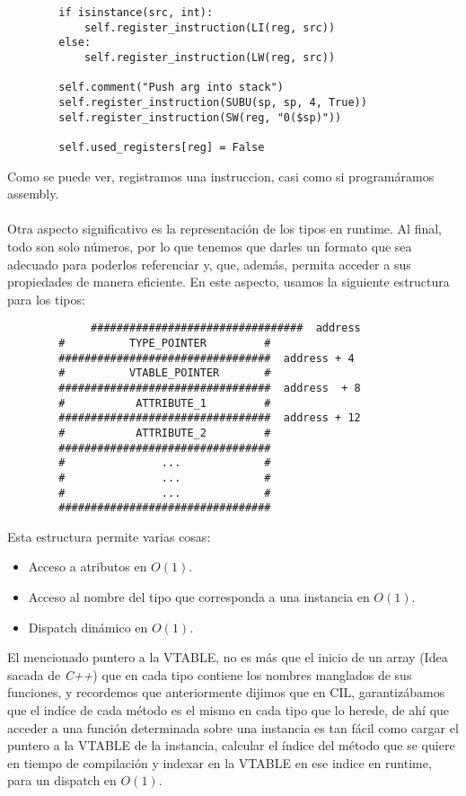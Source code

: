 \documentclass[a4paper, 12pt]{article}
\begin{document}
\begin{itemize}
\begin{verbatim}
        if isinstance(src, int):
            self.register_instruction(LI(reg, src))
        else:
            self.register_instruction(LW(reg, src))

        self.comment("Push arg into stack")
        self.register_instruction(SUBU(sp, sp, 4, True))
        self.register_instruction(SW(reg, "0($sp)"))

        self.used_registers[reg] = False
\end{verbatim}

Como se puede ver, registramos una instruccion, casi como si program\'aramos assembly.

\paragraph{}
Otra aspecto significativo es la representaci\'on de los tipos en runtime. Al final, todo son solo n\'umeros,
por lo que tenemos que darles un formato que sea adecuado para poderlos referenciar y, que, adem\'as, permita
acceder a sus propiedades de manera eficiente. En este aspecto, usamos la siguiente estructura para los tipos:

\begin{verbatim}
		     #################################  address
    	#          TYPE_POINTER         #
    	#################################  address + 4
    	#          VTABLE_POINTER       #
    	#################################  address  + 8
    	#           ATTRIBUTE_1         #
    	#################################  address + 12
    	#           ATTRIBUTE_2         #
    	#################################
    	#               ...             #
    	#               ...             #
    	#               ...             #
    	#################################
\end{verbatim}

Esta estructura permite varias cosas:
\begin{itemize}
	\item Acceso a atributos en $O(1)$.
	\item Acceso al nombre del tipo que corresponda a una instancia en $O(1)$.
	\item Dispatch din\'amico en $O(1)$.
\end{itemize}

El mencionado puntero a la VTABLE, no es m\'as que el inicio de un array (Idea sacada de \textit{C++}) que en cada
tipo contiene los nombres manglados de sus funciones, y recordemos que anteriormente dijimos que en CIL, 
garantiz\'abamos que el ind\'ice de cada m\'etodo es el mismo en cada tipo que lo herede, de ah\'i que 
acceder a una funci\'on determinada sobre una instancia es tan f\'acil como cargar el puntero a la VTABLE
de la instancia, calcular el \'indice del m\'etodo que se quiere en tiempo de compilaci\'on y indexar en la 
VTABLE en ese indice en runtime, para un dispatch en $O(1)$.


\end{itemize}
\end{document}
